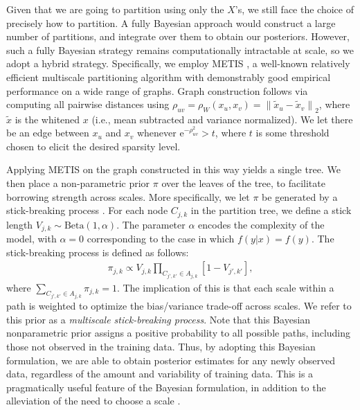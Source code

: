 \documentclass{article} %
\providecommand{\mt}[1]{\widetilde{#1}}
\providecommand{\norm}[1]{\left \lVert#1 \right  \rVert}
\newcommand{\ZZ}{\mathbb{Z}}
\newcommand{\dd}[1]{{\color{blue}{\it #1}}}
\begin{document}
	Given that we are going to partition using only the $X$'s, we still face the choice of precisely how to partition.  A fully Bayesian approach would construct a large number of partitions, and integrate over them to obtain our posteriors.  However, such a fully Bayesian strategy remains  computationally intractable at scale, so we adopt a hybrid strategy.  Specifically, we employ METIS \cite{METIS}, a well-known relatively efficient multiscale partitioning algorithm with demonstrably good empirical performance on a wide range of graphs.  Graph construction follows via computing all pairwise distances using $\rho_{uv}=\rho_W(x_u,x_v)=\norm{\mt{x}_u-\mt{x}_v}_2$, where $\mt{x}$ is the whitened $x$ (i.e., mean subtracted and variance normalized). We let there be an edge between $x_u$ and $x_v$ whenever  e$^{-\rho_{uv}^2} > t$, where $t$ is some threshold chosen to elicit the desired sparsity level.
	
	Applying METIS on the graph constructed in this way yields a single tree.  We then place a non-parametric prior $\pi$ over the leaves of the tree, to facilitate borrowing strength across scales.  More specifically, we let $\pi$ be generated by a stick-breaking process \cite{stickbreaking}.  For each node $C_{j,k}$ in the partition tree, we define a stick length $V_{j,k} \sim \mbox{Beta}(1,\alpha)$.  The parameter $\alpha$ encodes the complexity of the model, with $\alpha=0$ corresponding to the case in which $f(y|x) = f(y)$. The stick-breaking process is defined as follows: 
	\begin{eqnarray}
	\pi_{j,k} \propto V_{j,k} \prod_{C_{j',k'} \in A_{j,k}} \left[1 - V_{j',k'} \right] \label{eq:stick},
	\end{eqnarray}
where  $\sum_{C_{j',k'} \in A_{j,k}} \pi_{j,k} = 1$.  The implication of this is that each scale within a path is weighted to optimize the bias/variance trade-off across scales.  
We refer to this prior as a {\em multiscale stick-breaking process}. Note that this Bayesian nonparametric prior assigns a positive probability to all possible paths, including those not observed in the training data.  Thus, by adopting this Bayesian formulation, we are able to obtain posterior estimates for any newly observed data, regardless of the amount and variability of training data.  This is a pragmatically useful feature of the Bayesian formulation, in addition to the alleviation of the need to choose a scale \cite{ChenMaggioni12}.  %
\end{document}
